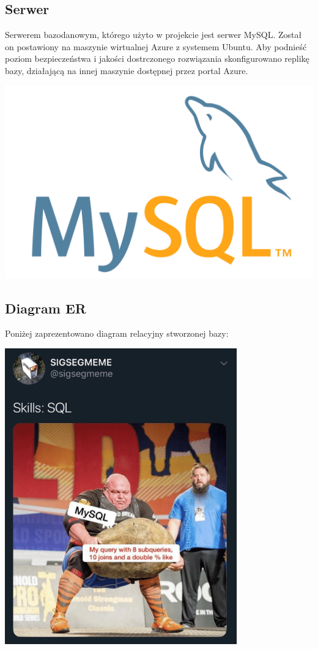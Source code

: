\documentclass[]{article}
\begin{document}
    \subsection{Serwer}
    Serwerem bazodanowym, którego użyto w projekcie jest serwer MySQL. Został on postawiony na maszynie wirtualnej Azure z systemem Ubuntu. Aby podnieść poziom bezpieczeństwa i jakości dostrczonego rozwiązania skonfigurowano replikę bazy, działającą na innej maszynie dostępnej przez portal Azure. \\
    \begin{center}
        \includegraphics[scale=0.05]{MySQL-Logo.png}
    \end{center}

    \subsection{Diagram ER}
    Poniżej zaprezentowano diagram relacyjny stworzonej bazy:

    \begin{center}
        \includegraphics[scale=0.8]{sql.PNG}
    \end{center}
\end{document}
